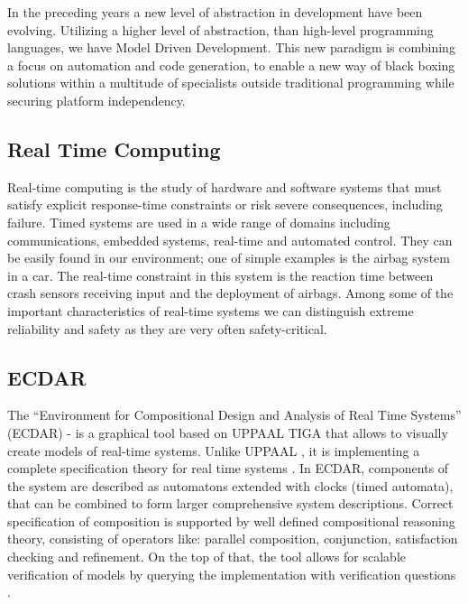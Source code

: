 In the preceding years a new level of abstraction in development have been
evolving. Utilizing a higher level of abstraction, than high-level programming
languages, we have Model Driven Development. This new paradigm is combining a
focus on automation and code generation, to enable a new way of black boxing
solutions within a multitude of specialists outside traditional programming
while securing platform independency.

\subsection {Real Time Computing}
\label{introduction-rts}

Real-time computing is the study of hardware and software systems that must
satisfy explicit response-time constraints or risk severe consequences,
including failure. Timed systems are used in a wide range of domains including
communications, embedded systems, real-time and automated control.  They can be
easily found in our environment; one of simple examples is the airbag system in
a car.  The real-time constraint in this system is the reaction time between
crash sensors receiving input and the deployment of airbags. Among some of the
important characteristics of real-time systems we can distinguish extreme
reliability and safety as they are very often safety-critical.

\subsection{ECDAR}
\label{introduction-ecdar}

The ``Environment for Compositional Design and Analysis of Real Time Systems''
(ECDAR) - is a graphical tool based on UPPAAL TIGA
\cite{behrmann_uppaal-tiga:_2006} that allows to visually create models of
real-time systems. Unlike UPPAAL \cite{larsen_uppaal_1997}, it is implementing a
complete specification theory for real time systems
\cite{David:2010:TIA:1755952.1755967,conf/atva/DavidLLNW10}. In ECDAR,
components of the system are described as automatons extended with clocks (timed
automata), that can be combined to form larger comprehensive system
descriptions. Correct specification of composition is supported by well defined
compositional reasoning theory, consisting of operators like: parallel
composition, conjunction, satisfaction checking and refinement. On the top of
that, the tool allows for scalable verification of models by querying the
implementation with verification questions \cite{conf/atva/DavidLLNW10}.


